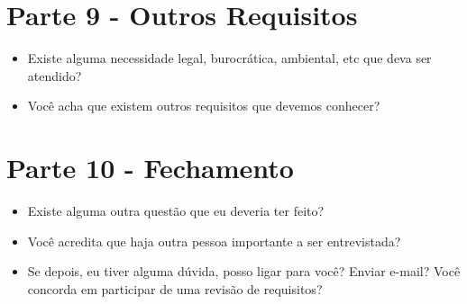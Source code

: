 \begin{anexosenv}
\section{Parte 9 - Outros Requisitos}
\begin{itemize}
  \item Existe alguma necessidade legal, burocrática, ambiental, etc que deva ser atendido?
  \item Você acha que existem outros requisitos que devemos conhecer?
\end{itemize}

\section{Parte 10 - Fechamento}
\begin{itemize}
  \item Existe alguma outra questão que eu deveria ter feito?
  \item Você acredita que haja outra pessoa importante a ser entrevistada?
  \item Se depois, eu tiver alguma dúvida, posso ligar para você? Enviar e-mail? Você concorda em participar de uma revisão de requisitos?
\end{itemize}

\end{anexosenv}

